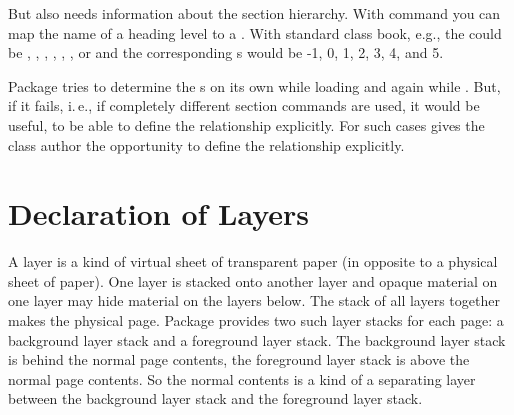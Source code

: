 But  also needs information about the section hierarchy.
With command  you can map
the name of a heading level to a . With standard class
book, e.g., the  could be , ,
, , ,
, or  and the corresponding
s would be -1, 0, 1, 2, 3, 4, and 5. 

Package  tries to determine the s on its
own while loading and again while . But, if
it fails, i.\,e., if completely different section commands are used, it would
be useful, to be able to define the relationship explicitly. For such cases
 gives the class author the opportunity to
define the relationship explicitly.%
\EndIndexGroup


\section{Declaration of Layers}

A layer is a kind of virtual sheet of transparent paper (in opposite to a
physical sheet of paper). One layer is stacked onto another layer and opaque
material on one layer may hide material on the layers below. The stack of all
layers together makes the physical page. Package 
provides two such layer stacks for each page: a background layer stack and a
foreground layer stack. The background layer stack is behind the normal page
contents, the foreground layer stack is above the normal page contents. So the
normal contents is a kind of a separating layer between the background layer
stack and the foreground layer stack.

